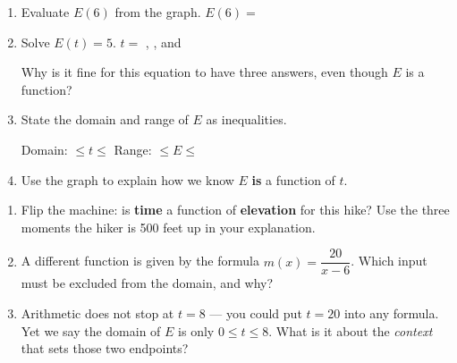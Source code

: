 \documentclass[10pt]{article}
\begin{document}
\boxguard
\begin{tcolorbox}[colback=white, colframe=black!40,
    title=\textbf{Tier A --- Approaching Proficiency},
    fonttitle=\bfseries, arc=2mm, left=3mm, right=3mm, top=2mm, bottom=2mm]

\begin{enumerate}[itemsep=8pt]
  \item Evaluate $E(6)$ from the graph. \quad $E(6) = $ \blank{1.6cm}

  \item Solve $E(t) = 5$. \quad $t = $ \blank{1.2cm}, \blank{1.2cm}, and
        \blank{1.2cm}

        Why is it fine for this equation to have three answers, even though $E$
        is a function?

        \vspace{0.05in}

  \item State the domain and range of $E$ as inequalities.

        \vspace{0.05in}
        Domain: \blank{1.2cm} $\le t \le$ \blank{1.2cm} \quad
        Range: \blank{1.2cm} $\le E \le$ \blank{1.2cm}

  \item Use the graph to explain how we know $E$ \textbf{is} a function of $t$.

        \vspace{0.05in}
        \writeline
\end{enumerate}
\end{tcolorbox}

\vspace{0.1in}

\boxguard
\begin{tcolorbox}[colback=white, colframe=black!40,
    title=\textbf{Tier E --- Extension},
    fonttitle=\bfseries, arc=2mm, left=3mm, right=3mm, top=2mm, bottom=2mm]

\begin{enumerate}[itemsep=8pt]
  \item Flip the machine: is \textbf{time} a function of \textbf{elevation} for
        this hike? Use the three moments the hiker is 500 feet up in your
        explanation.

        \vspace{0.05in}

  \item A different function is given by the formula $m(x) = \dfrac{20}{x - 6}$.
        Which input must be excluded from the domain, and why?

        \vspace{0.05in}

  \item Arithmetic does not stop at $t = 8$ --- you could put $t = 20$ into any
        formula. Yet we say the domain of $E$ is only $0 \le t \le 8$. What is
        it about the \textit{context} that sets those two endpoints?

        \vspace{0.05in}
\end{enumerate}
\end{tcolorbox}
\end{document}
